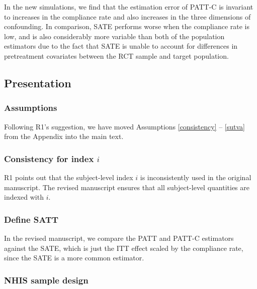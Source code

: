 \documentclass[hidelinks,12pt,letterpaper]{article}
\begin{document}
In the new simulations, we find that the estimation error of PATT-C is invariant to increases in the compliance rate and also increases in the three dimensions of confounding. In comparison, SATE performs worse when the compliance rate is low, and is also considerably more variable than both of the population estimators due to the fact that SATE is unable to account for differences in pretreatment covariates between the RCT sample and target population.

\subsection{Presentation}

\subsubsection{Assumptions}

Following R1's suggestion, we have moved Assumptions \ref{consistency} -- \ref{sutva} from the Appendix into the main text. 

\subsubsection{Consistency for index $i$}

R1 points out that the subject-level index $i$ is inconsistently used in the original manuscript. The revised manuscript ensures that all subject-level quantities are indexed with $i$. 

\subsubsection{Define SATT}
In the revised manuscript, we compare the PATT and PATT-C estimators against the SATE, which is just the ITT effect scaled by the compliance rate, since the SATE is a more common estimator. 
 
\subsubsection{NHIS sample design}
\end{document}
